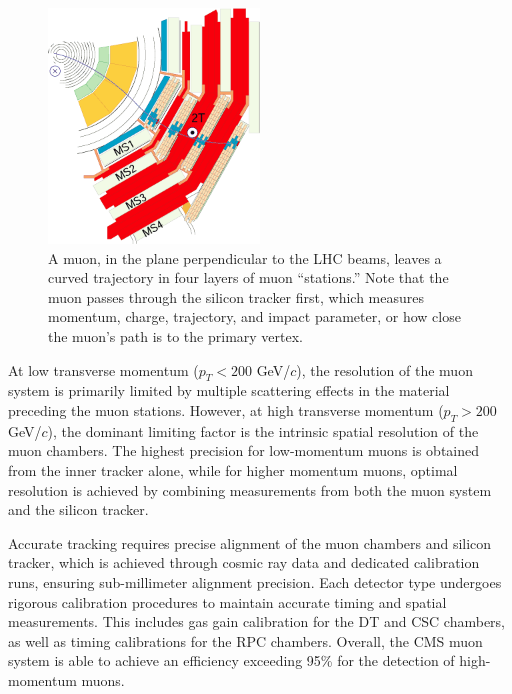 \begin{figure}
\centering
\includegraphics[width=0.50\textwidth]{figures/MuStations.png}
\caption{A muon, in the plane perpendicular to the LHC beams, leaves a curved trajectory in four layers of  muon ``stations.'' Note that the muon passes through the silicon tracker first, which measures momentum, charge, trajectory, and impact parameter, or how close the muon's path is to the primary vertex.}
\label{fig:MuStations}
\end{figure}    

At low transverse momentum (\( p_T < 200 \) GeV/\( c \)), the resolution of the muon system is primarily limited by multiple scattering effects in the material preceding the muon stations. However, at high transverse momentum (\( p_T > 200 \) GeV/\( c \)), the dominant limiting factor is the intrinsic spatial resolution of the muon chambers. The highest precision for low-momentum muons is obtained from the inner tracker alone, while for higher momentum muons, optimal resolution is achieved by combining measurements from both the muon system and the silicon tracker.

Accurate tracking requires precise alignment of the muon chambers and silicon tracker, which is achieved through cosmic ray data and dedicated calibration runs, ensuring sub-millimeter alignment precision. Each detector type undergoes rigorous calibration procedures to maintain accurate timing and spatial measurements. This includes gas gain calibration for the DT and CSC chambers, as well as timing calibrations for the RPC chambers. Overall, the CMS muon system is able to achieve an efficiency exceeding 95\% for the detection of high-momentum muons. 





